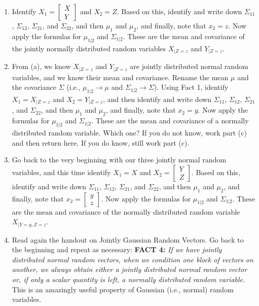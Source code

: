 \documentclass[letterpaper]{article}
\begin{document}
 \begin{enumerate}
\setlength{\itemsep}{.1in}
\renewcommand{\labelenumi}{(\alph{enumi})}

\item Identify $X_1 =  \left[\begin{array}{r} X \\ Y\end{array} \right] $ and $X_2 = Z$. Based on this, identify and write down $\Sigma_{11}$, $\Sigma_{12}$, $\Sigma_{21}$, and $\Sigma_{22}$, and then $\mu_1$ and $\mu_2$, and finally, note that $x_2=z$. Now apply the formulas for $\mu_{1|2}$ and $\Sigma_{1|2}$. These are the mean and covariance of the jointly normally distributed random variables $X_{|Z=z}$ and $Y_{|Z=z}$.

  \item From (a), we know   $X_{|Z=z}$ and $Y_{|Z=z}$ are jointly distributed normal random variables, and we know their mean and covariance. Rename the mean $\mu$ and the covariance $\Sigma$ (i.e., $\mu_{1|2} \to \mu$ and $\Sigma_{1|2} \to \Sigma$). Using Fact 1, identify $X_1 =  X_{|Z=z}$ and $X_2 = Y_{|Z=z}$, and then  identify and write down $\Sigma_{11}$, $\Sigma_{12}$, $\Sigma_{21}$, and $\Sigma_{22}$, and then $\mu_1$ and $\mu_2$, and finally, note that $x_2=y$.  Now apply the formulas for $\mu_{1|2}$ and $\Sigma_{1|2}$. These are the mean and covariance of a normally distributed random variable. Which one? If you do not know, work part (c) and then return here. If you do know, still work part (c).

  \item Go back to the very beginning with our three jointly normal random variables, and this time identify $X_1 =  X$ and $X_2 = \left[\begin{array}{r} Y \\ Z\end{array} \right] $. Based on this, identify and write down $\Sigma_{11}$, $\Sigma_{12}$, $\Sigma_{21}$, and $\Sigma_{22}$, and then $\mu_1$ and $\mu_2$, and finally, note that $x_2=\left[\begin{array}{r} y \\ z\end{array} \right] $. Now apply the formulas for $\mu_{1|2}$ and $\Sigma_{1|2}$. These are the mean and covariance of the normally distributed random variable $X_{|Y=y,Z=z}$.

      \item Read again the handout on Jointly Gaussian Random Vectors. Go back to the beginning and repeat as necessary: \textbf{FACT 4:} \textit{If we have jointly distributed normal random vectors, when we condition one block of vectors on another, we always obtain either a jointly distributed normal random vector or, if only a scalar quantity is left,  a normally distributed random variable.} This is an amazingly useful property of Gaussian (i.e., normal) random variables.

\end{enumerate}
\end{document}
